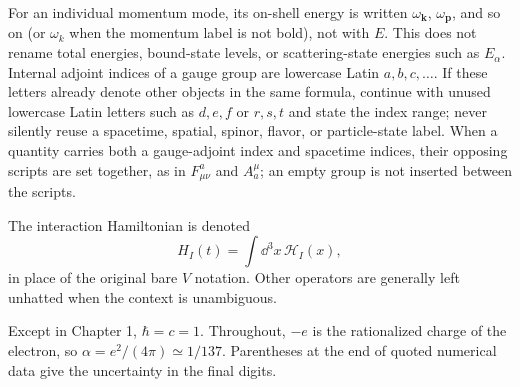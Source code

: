 For an individual momentum mode, its on-shell energy is written
$\omega_{\mathbf k}$, $\omega_{\mathbf p}$, and so on (or $\omega_k$ when the
momentum label is not bold), not with $E$. This does not rename total energies,
bound-state levels, or scattering-state energies such as $E_\alpha$.
Internal adjoint indices of a gauge group are lowercase Latin
$a,b,c,\ldots$. If these letters already denote other objects in the same
formula, continue with unused lowercase Latin letters such as $d,e,f$ or
$r,s,t$ and state the index range; never silently reuse a spacetime, spatial,
spinor, flavor, or particle-state label.
When a quantity carries both a gauge-adjoint index and spacetime indices,
their opposing scripts are set together, as in
$F^a_{\mu\nu}$ and $A_a^\mu$;
an empty group is not inserted between the scripts.

The interaction Hamiltonian is denoted
\[
  H_I(t)=\int \dd^3x\,\mathcal H_I(x),
\]
in place of the original bare $V$ notation. Other operators are generally left
unhatted when the context is unambiguous.

Except in Chapter 1, $\hbar=c=1$. Throughout, $-e$ is the rationalized charge
of the electron, so $\alpha=e^2/(4\pi)\simeq 1/137$. Parentheses at the end of
quoted numerical data give the uncertainty in the final digits.
